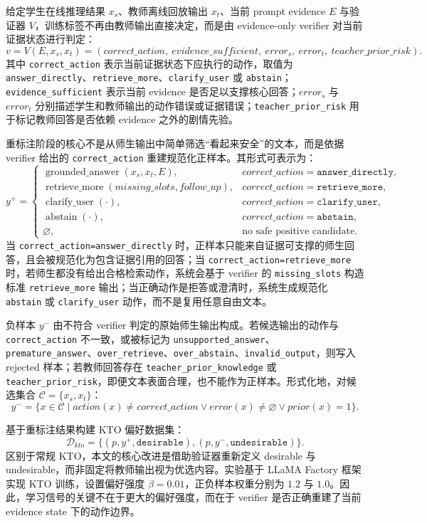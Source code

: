 \documentclass[UTF8,a4paper,12pt]{ctexart}
\newcommand{\code}[1]{\texttt{#1}}
\begin{document}
给定学生在线推理结果 $x_s$、教师离线回放输出 $x_t$、当前 prompt evidence $E$ 与验证器 $V$，训练标签不再由教师输出直接决定，而是由 evidence-only verifier 对当前证据状态进行判定：
\[
v=V(E,x_s,x_t)=(correct\_action,\ evidence\_sufficient,\ error_s,\ error_t,\ teacher\_prior\_risk).
\]
其中 \code{correct\_action} 表示当前证据状态下应执行的动作，取值为 \code{answer\_directly}、\code{retrieve\_more}、\code{clarify\_user} 或 \code{abstain}；\code{evidence\_sufficient} 表示当前 evidence 是否足以支撑核心回答；$error_s$ 与 $error_t$ 分别描述学生和教师输出的动作错误或证据错误；\code{teacher\_prior\_risk} 用于标记教师回答是否依赖 evidence 之外的剧情先验。

重标注阶段的核心不是从师生输出中简单筛选“看起来安全”的文本，而是依据 verifier 给出的 \code{correct\_action} 重建规范化正样本。其形式可表示为：
\[
y^+ =
\begin{cases}
\operatorname{grounded\_answer}(x_s,x_t,E), & correct\_action=\texttt{answer\_directly},\\
\operatorname{retrieve\_more}(missing\_slots,follow\_up), & correct\_action=\texttt{retrieve\_more},\\
\operatorname{clarify\_user}(\cdot), & correct\_action=\texttt{clarify\_user},\\
\operatorname{abstain}(\cdot), & correct\_action=\texttt{abstain},\\
\varnothing, & \text{no safe positive candidate}.
\end{cases}
\]
当 \code{correct\_action=answer\_directly} 时，正样本只能来自证据可支撑的师生回答，且会被规范化为包含证据引用的回答；当 \code{correct\_action=retrieve\_more} 时，若师生都没有给出合格检索动作，系统会基于 verifier 的 \code{missing\_slots} 构造标准 \code{retrieve\_more} 输出；当正确动作是拒答或澄清时，系统生成规范化 \code{abstain} 或 \code{clarify\_user} 动作，而不是复用任意自由文本。

负样本 $y^-$ 由不符合 verifier 判定的原始师生输出构成。若候选输出的动作与 \code{correct\_action} 不一致，或被标记为 \code{unsupported\_answer}、\code{premature\_answer}、\code{over\_retrieve}、\code{over\_abstain}、\code{invalid\_output}，则写入 rejected 样本；若教师回答存在 \code{teacher\_prior\_knowledge} 或 \code{teacher\_prior\_risk}，即便文本表面合理，也不能作为正样本。形式化地，对候选集合 $\mathcal{C}=\{x_s,x_t\}$：
\[
y^-=\{x\in\mathcal{C}\mid action(x)\neq correct\_action \lor error(x)\neq\varnothing \lor prior(x)=1\}.
\]

基于重标注结果构建 KTO 偏好数据集：
\[
\mathcal{D}_{kto}=\{(p,y^+,\texttt{desirable}), (p,y^-,\texttt{undesirable})\}.
\]
区别于常规 KTO，本文的核心改进是借助验证器重新定义 desirable 与 undesirable，而非固定将教师输出视为优选内容。实验基于 LLaMA Factory 框架实现 KTO 训练，设置偏好强度 $\beta=0.01$，正负样本权重分别为 $1.2$ 与 $1.0$。因此，学习信号的关键不在于更大的偏好强度，而在于 verifier 是否正确重建了当前 evidence state 下的动作边界。
\end{document}
